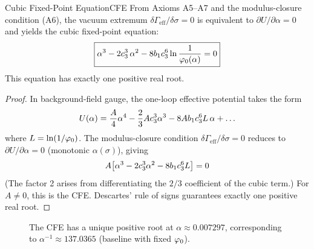 \begin{theorem}{Cubic Fixed-Point Equation}{CFE}
From Axioms A5--A7 and the modulus-closure condition (A6), the vacuum extremum
$\delta\Gamma_{\mathrm{eff}}/\delta\sigma=0$ is equivalent to $\partial U/\partial\alpha = 0$
and yields the cubic fixed-point equation:
\begin{equation}
    \boxed{\alpha^3 - 2c_3^3\,\alpha^2 - 8b_1c_3^6\ln\frac{1}{\varphi_0(\alpha)} = 0}
    \label{eq:CFE}
\end{equation}
This equation has exactly one positive real root.
\end{theorem}

\begin{proof}
In background-field gauge, the one-loop effective potential takes the form
\begin{equation}
    U(\alpha) = \frac{A}{4}\alpha^4 - \frac{2}{3}Ac_3^3\alpha^3 - 8Ab_1c_3^6 L\,\alpha + \ldots
\end{equation}
where $L = \ln(1/\varphi_0)$. The modulus-closure condition 
$\delta\Gamma_{\mathrm{eff}}/\delta\sigma = 0$ reduces to $\partial U/\partial\alpha = 0$
(monotonic $\alpha(\sigma)$), giving
\begin{equation}
    A\bigl[\alpha^3 - 2c_3^3\alpha^2 - 8b_1c_3^6 L\bigr] = 0
\end{equation}
(The factor 2 arises from differentiating the $2/3$ coefficient of the cubic term.)
For $A \neq 0$, this is the CFE. Descartes' rule of signs guarantees exactly 
one positive real root.
\end{proof}

\begin{figure}[H]
\centering
{}
\caption{The CFE has a unique positive root at $\alpha \approx 0.007297$, 
corresponding to $\alpha^{-1} \approx 137.0365$ (baseline with fixed $\varphi_0$).}
\label{fig:CFE}
\end{figure}

